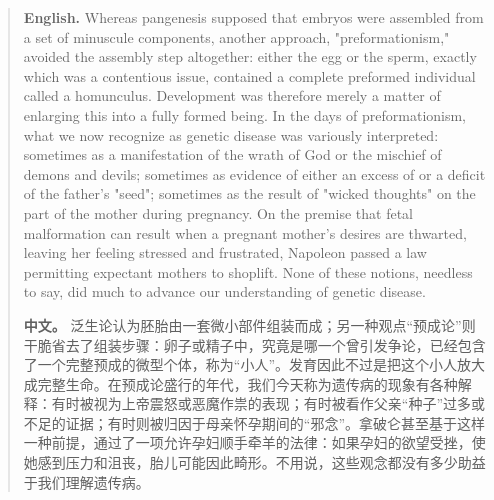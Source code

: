\begin{quote}
\noindent\textbf{English.} Whereas pangenesis supposed that embryos were assembled from a set of minuscule components, another approach, "preformationism," avoided the assembly step altogether: either the egg or the sperm, exactly which was a contentious issue, contained a complete preformed individual called a homunculus. Development was therefore merely a matter of enlarging this into a fully formed being. In the days of preformationism, what we now recognize as genetic disease was variously interpreted: sometimes as a manifestation of the wrath of God or the mischief of demons and devils; sometimes as evidence of either an excess of or a deficit of the father's "seed"; sometimes as the result of "wicked thoughts" on the part of the mother during pregnancy. On the premise that fetal malformation can result when a pregnant mother's desires are thwarted, leaving her feeling stressed and frustrated, Napoleon passed a law permitting expectant mothers to shoplift. None of these notions, needless to say, did much to advance our understanding of genetic disease.

\smallskip
\noindent\textbf{中文。} 泛生论认为胚胎由一套微小部件组装而成；另一种观点“预成论”则干脆省去了组装步骤：卵子或精子中，究竟是哪一个曾引发争论，已经包含了一个完整预成的微型个体，称为“小人”。发育因此不过是把这个小人放大成完整生命。在预成论盛行的年代，我们今天称为遗传病的现象有各种解释：有时被视为上帝震怒或恶魔作祟的表现；有时被看作父亲“种子”过多或不足的证据；有时则被归因于母亲怀孕期间的“邪念”。拿破仑甚至基于这样一种前提，通过了一项允许孕妇顺手牵羊的法律：如果孕妇的欲望受挫，使她感到压力和沮丧，胎儿可能因此畸形。不用说，这些观念都没有多少助益于我们理解遗传病。
\end{quote}

